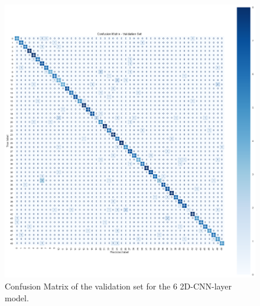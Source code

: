 \documentclass{article}
\begin{document}
\begin{sloppy}
\begin{figure}[ht]
  \centering
  \centerline{\includegraphics[width=\columnwidth]{6_2D_CNN_layer_model_confusion_matrix_val.png}}
  \caption{Confusion Matrix of the validation set for the 6 2D-CNN-layer model.}
  \label{fig:6_2D_CNN_layer_model_confusion_matrix_val}
\end{figure}


\end{sloppy}
\end{document}
